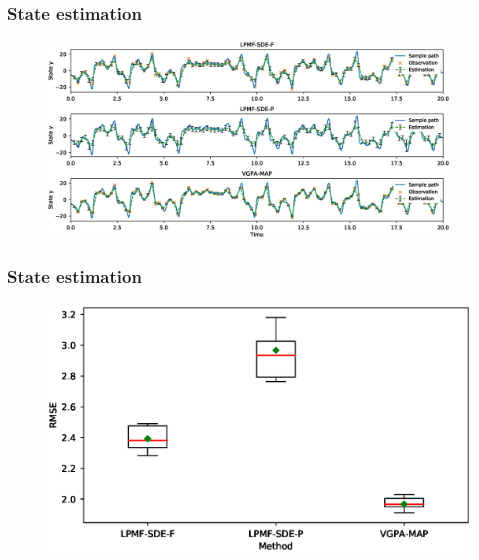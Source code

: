 \begin{frame}[t]
    \frametitle{State estimation}
    \begin{figure}
        \centering
        \includegraphics[width=0.95\textwidth]{graphics/lorenz-63-states}
        \label{fig-lorenz-63-states}
    \end{figure}
\end{frame}

\begin{frame}[t]
    \frametitle{State estimation}
    \begin{figure}
        \centering
        \includegraphics[width=0.7\linewidth]{graphics/lorenz-63-states-boxplot}
        \label{fig-lorenz-63-state-boxplot}
    \end{figure}            
\end{frame}

